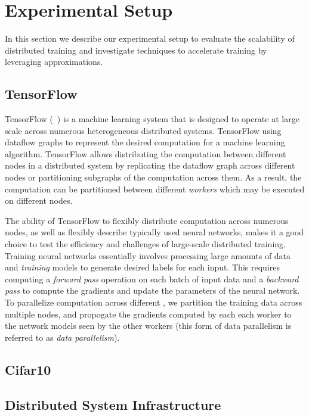 \section{Experimental Setup}
In this section we describe our experimental setup to evaluate the scalability of distributed training and investigate techniques to accelerate training by leveraging approximations. 
\subsection{TensorFlow}
TensorFlow (~\cite{tensorflow}) is a machine learning system that is designed to operate at large scale across numerous heterogeneous distributed systems. TensorFlow using dataflow graphs to represent the desired computation for a machine learning algorithm. TensorFlow allows distributing the computation between different nodes in a distributed system by replicating the dataflow graph across different nodes or partitioning subgraphs of the computation across them. As a result, the computation can be partitioned between different \emph{workers} which may be executed on different nodes. 

The ability of TensorFlow to flexibly distribute computation across numerous nodes, as well as flexibly describe typically used neural networks, makes it a good choice to test the efficiency and challenges of large-scale distributed training. Training neural networks essentially involves processing large amounts of data and \emph{training} models to generate desired labels for each input. This requires computing a \emph{forward pass} operation on each batch of input data and a \emph{backward pass} to compute the gradients and update the parameters of the neural network. To parallelize computation across different , we partition the training data across multiple nodes, and propogate the gradients computed by each each worker to the network models seen by the other workers (this form of data parallelism is referred to as \emph{data parallelism}). 

\subsection{Cifar10}
\subsection{Distributed System Infrastructure}
